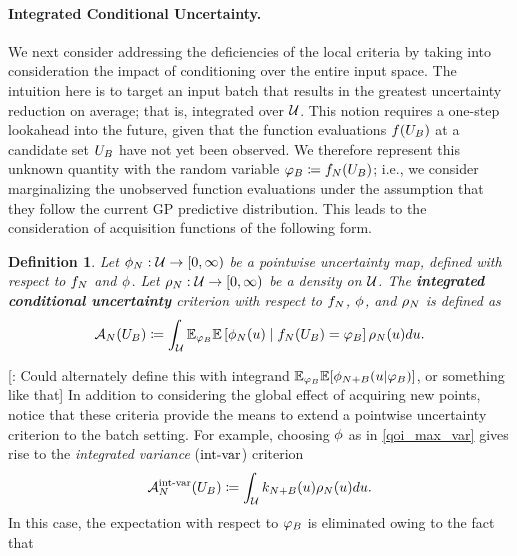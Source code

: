 \documentclass[12pt]{article}
\newtheorem{definition}{Definition}
\begin{document}
\paragraph{Integrated Conditional Uncertainty.} 
We next consider addressing the deficiencies of the local criteria by taking into consideration the impact of conditioning 
over the entire input space.
The intuition here is to target an input batch that results in the greatest uncertainty reduction on average; that is, integrated
over $\parSpace$. This notion requires a one-step lookahead into the future, given that the function evaluations 
$\func(\designBatchIn)$ at a candidate set $\designBatchIn$ have not yet been observed. We therefore represent 
this unknown quantity with the random variable $\funcVal[\Nbatch] \Def \funcEm(\designBatchIn)$; i.e., we consider 
marginalizing the unobserved function evaluations under the assumption that they follow the current GP predictive distribution. 
This leads to the consideration of acquisition functions of the following form.
\begin{definition}
Let $\qoi: \parSpace \to [0, \infty)$ be a pointwise uncertainty map, defined with respect to $\funcEm$
and $\qoiMap$. Let $\weightDens: \parSpace \to [0,\infty)$ be a density on $\parSpace$. 
The \textbf{integrated conditional uncertainty} criterion with respect to $\funcEm$, $\qoiMap$, and $\weightDens$ is 
defined as
\begin{equation}
\acq[\Ndesign](\designIn[\Nbatch])
\Def \int_{\parSpace} \E_{\funcVal[\Nbatch]} \E \left[\qoi(\Par) \given 
\funcEm[\Ndesign](\designBatchIn) = \designBatchFunc \right] \weightDens(\Par) d\Par. \label{acq_int_cond_unc}
\end{equation}
\end{definition}
[\todo: Could alternately define this with integrand $\E_{\funcVal[\Nbatch]} \E[\qoi[\Naugment](\Par|\funcVal[\Nbatch])]$,
or something like that]
In addition to considering the global effect of acquiring new points, notice that these criteria provide the means to 
extend a pointwise uncertainty criterion to the batch setting. For example, choosing $\qoiMap$ as in \ref{qoi_max_var}
gives rise to the \textit{integrated variance} ($\intvarLabel$) criterion
\begin{equation}
\labelAcq[\Ndesign]{\intvarLabel}(\designBatchIn)
\Def \int_{\parSpace} \gpKer[\Naugment](\Par) \weightDens(\Par) d\Par. \label{acq_int_var}
\end{equation}
In this case, the expectation with respect to $\funcVal[\Nbatch]$ is eliminated owing to the fact that 
\end{document}
